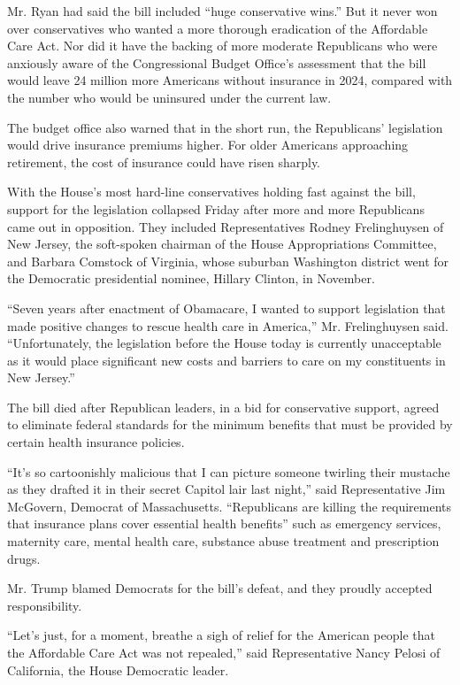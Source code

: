 Mr. Ryan had said the bill included ``huge conservative wins.'' But it
never won over conservatives who wanted a more thorough eradication of
the Affordable Care Act. Nor did it have the backing of more moderate
Republicans who were anxiously aware of the Congressional Budget
Office's assessment that the bill would leave 24 million more Americans
without insurance in 2024, compared with the number who would be
uninsured under the current law.

The budget office also warned that in the short run, the Republicans'
legislation would drive insurance premiums higher. For older Americans
approaching retirement, the cost of insurance could have risen sharply.

With the House's most hard-line conservatives holding fast against the
bill, support for the legislation collapsed Friday after more and more
Republicans came out in opposition. They included Representatives Rodney
Frelinghuysen of New Jersey, the soft-spoken chairman of the House
Appropriations Committee, and Barbara Comstock of Virginia, whose
suburban Washington district went for the Democratic presidential
nominee, Hillary Clinton, in November.

``Seven years after enactment of Obamacare, I wanted to support
legislation that made positive changes to rescue health care in
America,'' Mr. Frelinghuysen said. ``Unfortunately, the legislation
before the House today is currently unacceptable as it would place
significant new costs and barriers to care on my constituents in New
Jersey.''

The bill died after Republican leaders, in a bid for conservative
support, agreed to eliminate federal standards for the minimum benefits
that must be provided by certain health insurance policies.

``It's so cartoonishly malicious that I can picture someone twirling
their mustache as they drafted it in their secret Capitol lair last
night,'' said Representative Jim McGovern, Democrat of Massachusetts.
``Republicans are killing the requirements that insurance plans cover
essential health benefits'' such as emergency services, maternity care,
mental health care, substance abuse treatment and prescription drugs.

Mr. Trump blamed Democrats for the bill's defeat, and they proudly
accepted responsibility.

``Let's just, for a moment, breathe a sigh of relief for the American
people that the Affordable Care Act was not repealed,'' said
Representative Nancy Pelosi of California, the House Democratic leader.

